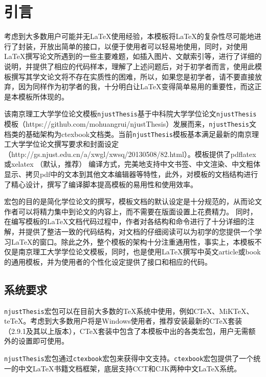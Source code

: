 
\chapter{引言}
\label{chap:introduction}

考虑到大多数用户可能并无\LaTeX{}使用经验，本模板将\LaTeX{}的复杂性尽可能地进行了封装，开放出简单的接口，以便于使用者可以轻易地使用，同时，对使用\LaTeX{}撰写论文所遇到的一些主要难题，如插入图片、文献索引等，进行了详细的说明，并提供了相应的代码样本，理解了上述问题后，对于初学者而言，使用此模板撰写其学文论文将不存在实质性的困难，所以，如果您是初学者，请不要直接放弃，因为同样作为初学者的我，十分明白让\LaTeX{}变得简单易用的重要性，而这正是本模板所体现的。

该南京理工大学学位论文模板\texttt{njustThesis}基于中科院大学学位论文\texttt{njustThesis}模板（https://github.com/mohuangrui/njustThesis）发展而来，\texttt{njustThesis}文档类的基础架构为ctexbook文档类。当前\texttt{njustThesis}模板基本满足最新的南京理工大学学位论文撰写要求和封面设定（http://gs.njust.edu.cn/a/xwgl/xwsq/20130508/82.html）。模板提供了pdflatex 或xelatex （默认，推荐） 编译方式，完美地支持中文书签、中文渲染、中文粗体显示、拷贝pdf中的文本到其他文本编辑器等特性，此外，对模板的文档结构进行了精心设计，撰写了编译脚本提高模板的易用性和使用效率。

宏包的目的是简化学位论文的撰写，模板文档的默认设定是十分规范的，从而论文作者可以将精力集中到论文的内容上，而不需要在版面设置上花费精力。 同时，在编写模板的\LaTeX{}文档代码过程中，作者对各结构和命令进行了十分详细的注解，并提供了整洁一致的代码结构，对文档的仔细阅读可以为初学的您提供一个学习\LaTeX{}的窗口。除此之外，整个模板的架构十分注重通用性，事实上，本模板不仅是南京理工大学学位论文模板，同时，也是使用\LaTeX{}撰写中英文article或book的通用模板，并为使用者的个性化设定提供了接口和相应的代码。

\section{系统要求}
\label{sec:sysRequire}

\texttt{njustThesis}宏包可以在目前大多数的\TeX{}系统中使用，例如C\TeX{}、MiK\TeX{}、te\TeX{}。考虑到大多数用户将是Windows使用者，推荐安装最新的C\TeX{}套装（2.9.1及其以上版本），C\TeX{}套装中包含了本模板中出的各类宏包，用户无需额外的设置即可使用。

\texttt{njustThesis}宏包通过\texttt{ctexbook}宏包来获得中文支持。\texttt{ctexbook}宏包提供了一个统一的中文\LaTeX{}书籍文档框架，底层支持CCT和CJK两种中文\LaTeX{}系统。

